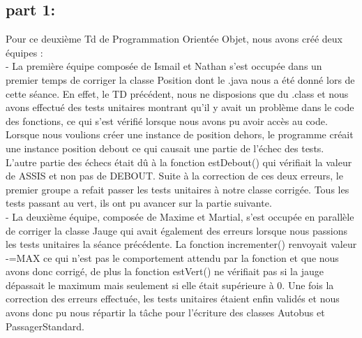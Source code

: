 \documentclass{article}
\begin{document}
\subsection{part 1: }
Pour ce deuxième Td de Programmation Orientée Objet, nous avons créé deux équipes :\\
- La première équipe composée de Ismail et Nathan s’est occupée dans un premier
temps de corriger la classe Position dont le .java nous a été donné lors de cette
séance. En effet, le TD précédent, nous ne disposions que du .class et nous avons
effectué des tests unitaires montrant qu’il y avait un problème dans le code des
fonctions, ce qui s'est vérifié lorsque nous avons pu avoir accès au code. Lorsque
nous voulions créer une instance de position dehors, le programme créait une
instance position debout ce qui causait une partie de l’échec des tests. L’autre partie
des échecs était dû à la fonction estDebout() qui vérifiait la valeur de ASSIS et non
pas de DEBOUT. Suite à la correction de ces deux erreurs, le premier groupe a refait
passer les tests unitaires à notre classe corrigée. Tous les tests passant au vert, ils
ont pu avancer sur la partie suivante.\\
- La deuxième équipe, composée de Maxime et Martial, s’est occupée en parallèle de
corriger la classe Jauge qui avait également des erreurs lorsque nous passions les
tests unitaires la séance précédente. La fonction incrementer() renvoyait valeur
-=MAX ce qui n’est pas le comportement attendu par la fonction et que nous avons
donc corrigé, de plus la fonction estVert() ne vérifiait pas si la jauge dépassait le
maximum mais seulement si elle était supérieure à 0. Une fois la correction des
erreurs effectuée, les tests unitaires étaient enfin validés et nous avons donc pu nous
répartir la tâche pour l’écriture des classes Autobus et PassagerStandard.\\
\end{document}
